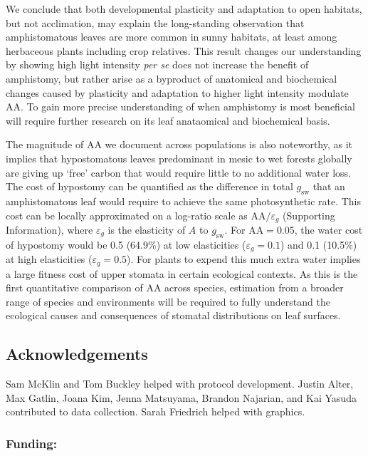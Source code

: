 \documentclass[
  letterpaper,
  DIV=11,
  numbers=noendperiod]{scrartcl}
\newcommand{\aax}{$\mathrm{AA}$}
\newcommand{\gsw}{$g_\text{sw}$}
\begin{document}
We conclude that both developmental plasticity and adaptation to open
habitats, but not acclimation, may explain the long-standing observation
that amphistomatous leaves are more common in sunny habitats, at least
among herbaceous plants including crop relatives. This result changes
our understanding by showing high light intensity \emph{per se} does not
increase the benefit of amphistomy, but rather arise as a byproduct of
anatomical and biochemical changes caused by plasticity and adaptation
to higher light intensity modulate \aax{}. To gain more precise
understanding of when amphistomy is most beneficial will require further
research on its leaf anataomical and biochemical basis.

The magnitude of \aax{} we document across populations is also
noteworthy, as it implies that hypostomatous leaves predominant in mesic
to wet forests globally are giving up `free' carbon that would require
little to no additional water loss. The cost of hypostomy can be
quantified as the difference in total \gsw{} that an amphistomatous leaf
would require to achieve the same photosynthetic rate. This cost can be
locally approximated on a log-ratio scale as
\(\mathrm{AA} / \varepsilon_g\) (Supporting Information), where
\(\varepsilon_g\) is the elasticity of \(A\) to \gsw. For
\(\mathrm{AA} = 0.05\), the water cost of hypostomy would be 0.5
(64.9\%) at low elasticities (\(\varepsilon_g = 0.1\)) and 0.1 (10.5\%)
at high elasticities (\(\varepsilon_g = 0.5\)). For plants to expend
this much extra water implies a large fitness cost of upper stomata in
certain ecological contexts. As this is the first quantitative
comparison of \aax{} across species, estimation from a broader range of
species and environments will be required to fully understand the
ecological causes and consequences of stomatal distributions on leaf
surfaces.

\subsection{Acknowledgements}\label{acknowledgements}

Sam McKlin and Tom Buckley helped with protocol development. Justin
Alter, Max Gatlin, Joana Kim, Jenna Matsuyama, Brandon Najarian, and Kai
Yasuda contributed to data collection. Sarah Friedrich helped with
graphics.

\subsubsection{Funding:}\label{funding}
\end{document}
